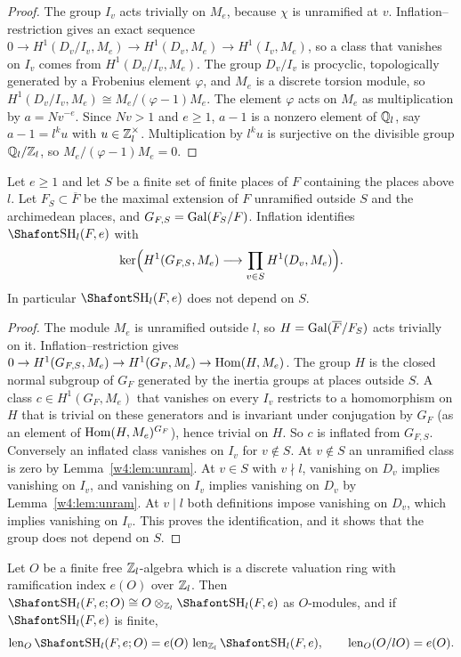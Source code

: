 \begin{proof}
The group $I_v$ acts trivially on $M_e$, because $\chi$ is unramified at $v$. Inflation--restriction gives an exact sequence $0\to H^1(D_v/I_v,M_e)\to H^1(D_v,M_e)\to H^1(I_v,M_e)$, so a class that vanishes on $I_v$ comes from $H^1(D_v/I_v,M_e)$. The group $D_v/I_v$ is procyclic, topologically generated by a Frobenius element $\varphi$, and $M_e$ is a discrete torsion module, so $H^1(D_v/I_v,M_e)\cong M_e/(\varphi-1)M_e$. The element $\varphi$ acts on $M_e$ as multiplication by $a=Nv^{-e}$. Since $Nv>1$ and $e\ge1$, $a-1$ is a nonzero element of $\mathbb Q_l$, say $a-1=l^ku$ with $u\in\mathbb Z_l^\times$. Multiplication by $l^ku$ is surjective on the divisible group $\mathbb Q_l/\mathbb Z_l$, so $M_e/(\varphi-1)M_e=0$.
\end{proof}

\begin{lemma}\label{w4:lem:indepS}
Let $e\ge1$ and let $S$ be a finite set of finite places of $F$ containing the places above $l$. Let $F_S\subset\overline F$ be the maximal extension of $F$ unramified outside $S$ and the archimedean places, and $G_{F,S}=\operatorname{Gal}(F_S/F)$. Inflation identifies $\Sha_l(F,e)$ with
\[
\ker\Bigl(H^1(G_{F,S},M_e)\longrightarrow\prod_{v\in S}H^1(D_v,M_e)\Bigr).
\]
In particular $\Sha_l(F,e)$ does not depend on $S$.
\end{lemma}

\begin{proof}
The module $M_e$ is unramified outside $l$, so $H=\operatorname{Gal}(\overline F/F_S)$ acts trivially on it. Inflation--restriction gives $0\to H^1(G_{F,S},M_e)\to H^1(G_F,M_e)\to\operatorname{Hom}(H,M_e)$. The group $H$ is the closed normal subgroup of $G_F$ generated by the inertia groups at places outside $S$. A class $c\in H^1(G_F,M_e)$ that vanishes on every $I_v$ restricts to a homomorphism on $H$ that is trivial on these generators and is invariant under conjugation by $G_F$ (as an element of $\operatorname{Hom}(H,M_e)^{G_F}$), hence trivial on $H$. So $c$ is inflated from $G_{F,S}$. Conversely an inflated class vanishes on $I_v$ for $v\notin S$. At $v\notin S$ an unramified class is zero by Lemma~\ref{w4:lem:unram}. At $v\in S$ with $v\nmid l$, vanishing on $D_v$ implies vanishing on $I_v$, and vanishing on $I_v$ implies vanishing on $D_v$ by Lemma~\ref{w4:lem:unram}. At $v\mid l$ both definitions impose vanishing on $D_v$, which implies vanishing on $I_v$. This proves the identification, and it shows that the group does not depend on $S$.
\end{proof}

\begin{lemma}\label{w4:lem:coef}
Let $O$ be a finite free $\mathbb Z_l$-algebra which is a discrete valuation ring with ramification index $e(O)$ over $\mathbb Z_l$. Then $\Sha_l(F,e;O)\cong O\otimes_{\Zl}\Sha_l(F,e)$ as $O$-modules, and if $\Sha_l(F,e)$ is finite,
\[
\len_O\Sha_l(F,e;O)=e(O)\,\len_{\Zl}\Sha_l(F,e),\qquad \len_O(O/lO)=e(O).
\]
\end{lemma}

